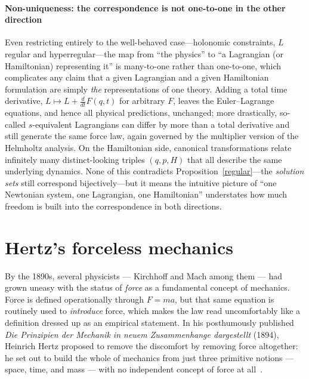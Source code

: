\paragraph{Non-uniqueness: the correspondence is not one-to-one in the other direction}
Even restricting entirely to the well-behaved case---holonomic constraints, $L$
regular and hyperregular---the map from ``the physics'' to ``a Lagrangian (or
Hamiltonian) representing it'' is many-to-one rather than one-to-one, which
complicates any claim that a given Lagrangian and a given Hamiltonian
formulation are simply \emph{the} representations of one theory. Adding a total
time derivative, $L \mapsto L + \frac{d}{dt}F(q,t)$ for arbitrary $F$, leaves
the Euler--Lagrange equations, and hence all physical predictions, unchanged;
more drastically, so-called $s$-equivalent Lagrangians can differ by more than
a total derivative and still generate the same force law, again governed by the
multiplier version of the Helmholtz analysis. On
the Hamiltonian side, canonical transformations relate infinitely many
distinct-looking triples $(q,p,H)$ that all describe the same underlying
dynamics. None of this contradicts Proposition~\ref{regular}---the
\emph{solution sets} still correspond bijectively---but it means the intuitive
picture of ``one Newtonian system, one Lagrangian, one Hamiltonian''
understates how much freedom is built into the correspondence in both
directions.







\section{Hertz's forceless mechanics }
\label{frm:hertz}

By the 1890s, several physicists --- Kirchhoff and Mach among them
--- had grown uneasy with the status of \emph{force} as a
fundamental concept of mechanics. Force is defined operationally
through $F=ma$, but that same equation is routinely used to
\emph{introduce} force, which makes the law read uncomfortably like
a definition dressed up as an empirical statement. In his
posthumously published \emph{Die Prinzipien der Mechanik in neuem
Zusammenhange dargestellt} (1894), Heinrich Hertz proposed to remove
the discomfort by removing force altogether: he set out to build the
whole of mechanics from just three primitive notions --- space,
time, and mass --- with no independent concept of force at
all~\cite{Hertz1899}.

